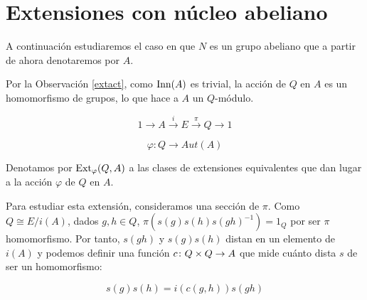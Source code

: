 
\section{Extensiones con núcleo abeliano}\label{sec:ab}
A continuación estudiaremos el caso en que $N$ es un grupo abeliano que a partir de ahora denotaremos por $A$. 
 
 Por la Observación \ref{extact}, como $\operatorname{Inn}(A)$ es trivial, la acción de $Q$ en $A$ es un homomorfismo de grupos, lo que hace a $A$ un $Q$-módulo.

\begin{equation}\label{exta}
	1\to A\xrightarrow{i} E\xrightarrow{\pi} Q\to 1
\end{equation}

\begin{equation}
	\varphi \colon Q \to Aut(A)
\end{equation}

\begin{definicion}
	Denotamos por $\operatorname{Ext}_\varphi(Q,A)$ a las clases de extensiones equivalentes que dan lugar a la acción $\varphi$ de $Q$ en $A$.
\end{definicion}

Para estudiar esta extensión, consideramos una sección de $\pi$. Como $Q\cong E/i(A)$, dados $g,h\in Q$, $\pi\left(s(g)s(h)s(gh)^{-1}\right) = 1_{Q}$ por ser $\pi$ homomorfismo. Por tanto, $s(gh)$ y $s(g)s(h)$ distan en un elemento de $i(A)$ y podemos definir una función $c\colon Q\times Q\to A$ que mide cuánto dista $s$ de ser un homomorfismo:

\begin{equation}
	s(g)s(h) = i\left(c(g,h)\right)s(gh)
\end{equation}

